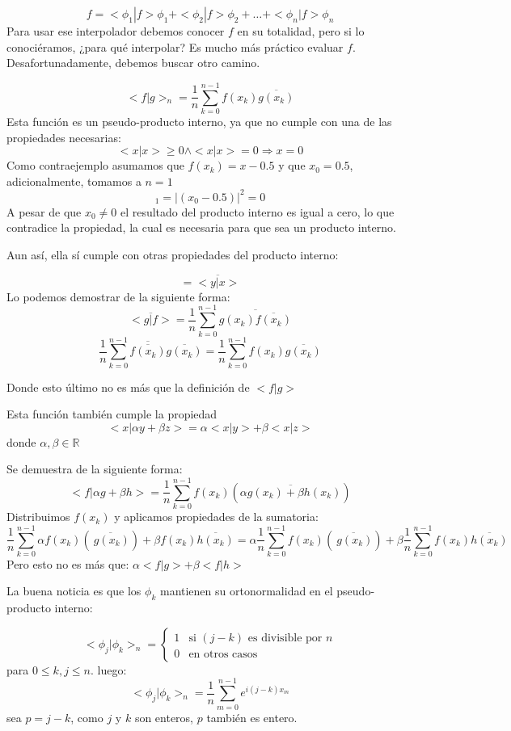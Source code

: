 \documentclass{article}
\begin{document}
\[ f = <\phi_1|f>\phi_1 + <\phi_2|f>\phi_2 + \dots + <\phi_n|f>\phi_n  \]
Para usar ese interpolador debemos conocer $f$ en su totalidad, pero si lo conociéramos, ¿para qué interpolar? Es mucho más práctico evaluar $f$. Desafortunadamente, debemos buscar otro camino.

\begin{equation}
    <f|g>_n = \frac{1}{n}\sum_{k=0}^{n-1}f(x_k)\overline{g(x_k)}
\end{equation}
Esta función es un pseudo-producto interno, ya que no cumple con una de las propiedades necesarias:
\[ <x|x> \geq 0           \land <x|x> = 0 \Longrightarrow x=0 \]
Como contraejemplo asumamos que $f(x_k) = x-0.5$ y que $x_0 = 0.5$, adicionalmente, tomamos a $n=1$
\[<x|x> _1= |(x_0-0.5)|^2=0\]
A pesar de que $x_0 \neq 0$ el resultado del producto interno es igual a cero, lo que contradice la propiedad, la cual es necesaria para que sea un producto interno.

Aun así, ella sí cumple con otras propiedades del producto interno:

\[<x|y> =  \overline{<y|x>}\]
Lo podemos demostrar de la siguiente forma:
\[\overline{<g|f>}=\frac{1}{n}\sum_{k=0}^{n-1}\overline{g(x_k)\overline{f(x_k)}}\]
\[\frac{1}{n}\sum_{k=0}^{n-1}\overline{\overline{f(x_k)}}\overline{g(x_k)}=\frac{1}{n}\sum_{k=0}^{n-1}f(x_k)\overline{g(x_k)}\]

Donde esto último no es más que la definición de $<f|g>$

Esta función también cumple la propiedad
\[<x|\alpha y+\beta z> = \alpha<x|y>+\beta<x|z>\]
donde $\alpha, \beta \in \mathbb{R}$

Se demuestra de la siguiente forma:
\[<f|\alpha g+\beta h>= \frac{1}{n}\sum_{k=0}^{n-1}f(x_k)(\overline{\alpha g(x_k)+\beta h(x_k)})\]
Distribuimos $f(x_k)$ y aplicamos propiedades de la sumatoria:
\[\frac{1}{n}\sum_{k=0}^{n-1}\alpha f(x_k)(\overline{\ g(x_k)})+\beta f(x_k)\overline {h(x_k)} = \alpha\frac{1}{n}\sum_{k=0}^{n-1} f(x_k)(\overline{\ g(x_k)})+\beta\frac{1}{n}\sum_{k=0}^{n-1} f(x_k)\overline {h(x_k)} \]
Pero esto no es más que: $\alpha<f|g>+\beta<f|h>$

La buena noticia es que los $\phi_k$ mantienen su ortonormalidad en el pseudo-producto interno:

\[<\phi_j| \phi_k >_n = 
\begin{cases}
1 & \text{si } (j-k) \text{ es divisible por } n \\
0 & \text{en otros casos}
\end{cases}\]
para $0\leq k,j \leq n$.
 luego:
\[<\phi_j| \phi_k >_n = \frac{1}{n}\sum_{m=0}^{n-1}e^{i(j-k)x_m}\]
sea $p = j-k$, como $j$ y $k$ son enteros, $p$ también es entero.
\end{document}
